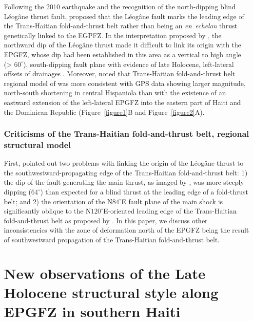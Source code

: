 \documentclass[linenumbers,draft]{agujournal}
\begin{document}
Following the 2010 earthquake and the recognition of the north-dipping blind L\'eog\^ane thrust fault, \citet{calais2010transpressional} proposed that the L\'eog\^ane fault marks the leading edge of the Trans-Haitian fold-and-thrust belt rather than being an \textit{en~echelon} thrust genetically linked to the EGPFZ. In the interpretation proposed by \citet{calais2010transpressional}, the northward dip of the L\'eog\^ane thrust made it difficult to link its origin with the EPGFZ, whose dip had been established in this area as a vertical to high angle (> $60^{\circ}$), south-dipping fault plane with evidence of late Holocene, left-lateral offsets of drainages \citep{prentice2010seismic}. Moreover, \citet{symithe2016present} noted that Trans-Haitian fold-and-thrust belt regional model of \citet{pubellier2000plate} was more consistent with GPS data showing larger magnitude, north-south shortening in central Hispaniola than with the existence of an eastward extension of the left-lateral EPGFZ into the eastern part of Haiti and the Dominican Republic (Figure~\ref{figure1}B and Figure~\ref{figure2}A).

\subsubsection{Criticisms of the Trans-Haitian fold-and-thrust belt, regional structural model}
First, \citet{mercier20112010} pointed out two problems with linking the origin of the L\'eog\^ane thrust to the southwestward-propagating edge of the Trans-Haitian fold-and-thrust belt: 1) the dip of the fault generating the main thrust, as imaged by \citet{mercier20112010}, was more steeply dipping ($64^{\circ}$) than expected for a blind thrust at the leading edge of a fold-thrust belt; and 2) the orientation of the N$84^{\circ}$E fault plane of the main shock is significantly oblique to the N$120^{\circ}$E-oriented leading edge of the Trans-Haitian fold-and-thrust belt as proposed by \citet{pubellier2000plate}. In this paper, we discuss other inconsistencies with the zone of deformation north of the EPGFZ being the result of southwestward propagation of the Trans-Haitian fold-and-thrust belt.

\section{New observations of the Late Holocene structural style along EPGFZ in southern Haiti}
\end{document}
